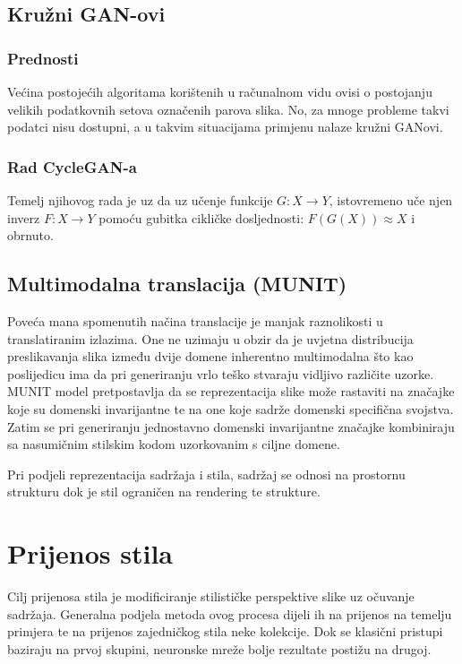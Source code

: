 \documentclass[lmodern, utf8, seminar]{fer}
\begin{document}
\section{Kružni GAN-ovi}

\subsection{Prednosti}
Većina postojećih algoritama korištenih u računalnom vidu ovisi o postojanju velikih podatkovnih setova označenih parova slika. No, za mnoge probleme takvi podatci nisu dostupni, a u takvim situacijama primjenu nalaze kružni GANovi.
\newline

\subsection{Rad CycleGAN-a}
Temelj njihovog rada je uz da uz učenje funkcije $G: X \rightarrow Y$, istovremeno uče njen inverz $F: X \rightarrow Y$ pomoću gubitka cikličke dosljednosti: $F(G(X)) \approx X$ i obrnuto.

\section{Multimodalna translacija (MUNIT)}
Poveća mana spomenutih načina translacije je manjak raznolikosti u translatiranim izlazima. One ne uzimaju u obzir da je uvjetna distribucija preslikavanja slika između dvije domene inherentno multimodalna \cite{huang2018multimodal} što kao poslijedicu ima da pri generiranju vrlo teško stvaraju vidljivo različite uzorke. MUNIT model pretpostavlja da se reprezentacija slike može rastaviti na značajke koje su domenski invarijantne te na one koje sadrže domenski specifična svojstva. Zatim se pri generiranju jednostavno domenski invarijantne značajke kombiniraju sa nasumičnim stilskim kodom uzorkovanim s ciljne domene.
\newline

Pri podjeli reprezentacija sadržaja i stila, sadržaj se odnosi na prostornu strukturu dok je stil ograničen na rendering te strukture.


\chapter{Prijenos stila}
Cilj prijenosa stila je modificiranje stilističke perspektive slike uz očuvanje sadržaja. Generalna podjela metoda ovog procesa dijeli ih na prijenos na temelju primjera te na prijenos zajedničkog stila neke kolekcije. Dok se klasični pristupi baziraju na prvoj skupini, neuronske mreže bolje rezultate postižu na drugoj.
\end{document}

